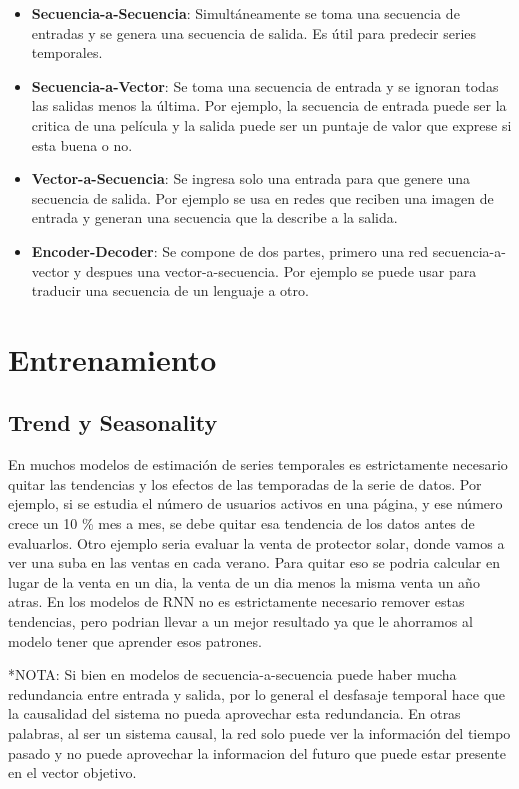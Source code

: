 \begin{itemize}
\item \textbf{Secuencia-a-Secuencia}: Simultáneamente se toma una secuencia de entradas y se genera una secuencia de salida. Es útil para predecir series temporales. 

\item \textbf{Secuencia-a-Vector}: Se toma una secuencia de entrada y se ignoran todas las salidas menos la última. Por ejemplo, la secuencia de entrada puede ser la critica de una película y la salida puede ser un puntaje de valor que exprese si esta buena o no. 

\item \textbf{Vector-a-Secuencia}: Se ingresa solo una entrada para que genere una secuencia de salida. Por ejemplo se usa en redes que reciben una imagen de entrada y generan una secuencia que la describe a la salida. 

\item \textbf{Encoder-Decoder}: Se compone de dos partes, primero una red secuencia-a-vector y despues una vector-a-secuencia. Por ejemplo se puede usar para traducir una secuencia de un lenguaje a otro. 
\end{itemize}

\section{Entrenamiento}

\subsection{Trend y Seasonality}
En muchos modelos de estimación de series temporales es estrictamente necesario quitar las tendencias y los efectos de las temporadas de la serie de datos. Por ejemplo, si se estudia el número de usuarios activos en una página, y ese número crece un 10 \% mes a mes, se debe quitar esa tendencia de los datos antes de evaluarlos. Otro ejemplo seria evaluar la venta de protector solar, donde vamos a ver una suba en las ventas en cada verano. Para quitar eso se podria calcular en lugar de la venta en un dia, la venta de un dia menos la misma venta un año atras. En los modelos de RNN no es estrictamente necesario remover estas tendencias, pero podrian llevar a un mejor resultado ya que le ahorramos al modelo tener que aprender esos patrones. 

*NOTA: Si bien en modelos de secuencia-a-secuencia puede haber mucha redundancia entre entrada y salida, por lo general el desfasaje temporal hace que la causalidad del sistema no pueda aprovechar esta redundancia. En otras palabras, al ser un sistema causal, la red solo puede ver la información del tiempo pasado y no puede aprovechar la informacion del futuro que puede estar presente en el vector objetivo. 

